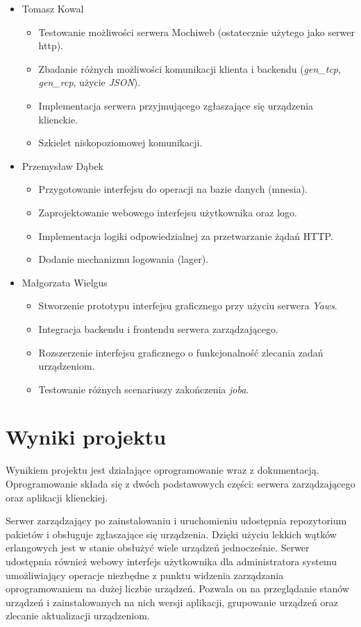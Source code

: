\documentclass[polish,12pt]{aghthesis}
\begin{document}
\begin{itemize}
  \item Tomasz Kowal
  \begin{itemize}
    \item Testowanie możliwości serwera Mochiweb (ostatecznie użytego jako serwer http).
    \item Zbadanie różnych możliwości komunikacji klienta i backendu (\emph{gen\_tcp}, \emph{gen\_rcp}, użycie \emph{JSON}).
    \item Implementacja serwera przyjmującego zgłaszające się urządzenia klienckie.
    \item Szkielet niskopoziomowej komunikacji.
  \end{itemize}
  \item Przemysław Dąbek
    \begin{itemize}
      \item Przygotowanie interfejsu do operacji na bazie danych (mnesia).
      \item Zaprojektowanie webowego interfejsu użytkownika oraz logo.
      \item Implementacja logiki odpowiedzialnej za przetwarzanie żądań HTTP.
      \item Dodanie mechanizmu logowania (lager).
    \end{itemize}
  \item Małgorzata Wielgus
    \begin{itemize}
      \item Stworzenie prototypu interfejsu graficznego przy użyciu serwera \emph{Yaws}.
      \item Integracja backendu i frontendu serwera zarządzającego.
      \item Rozszerzenie interfejsu graficznego o funkcjonalność zlecania zadań urządzeniom.
      \item Testowanie różnych scenariuszy zakończenia \emph{joba}.
    \end{itemize}
\end{itemize}


\section{Wyniki projektu}

Wynikiem projektu jest działające oprogramowanie wraz z dokumentacją. Oprogramowanie składa się z dwóch podstawowych części: serwera zarządzającego oraz aplikacji klienckiej.

Serwer zarządzający po zainstalowaniu i uruchomieniu udostępnia repozytorium pakietów i obsługuje zgłaszające się urządzenia. Dzięki użyciu lekkich wątków erlangowych jest w stanie obsłużyć wiele urządzeń jednocześnie. Serwer udostępnia również webowy interfejs użytkownika dla administratora systemu umożliwiający operacje niezbędne z punktu widzenia zarządzania oprogramowaniem na dużej liczbie urządzeń. Pozwala on na przeglądanie stanów urządzeń i zainstalowanych na nich wersji aplikacji, grupowanie urządzeń oraz zlecanie aktualizacji urządzeniom.
\end{document}
